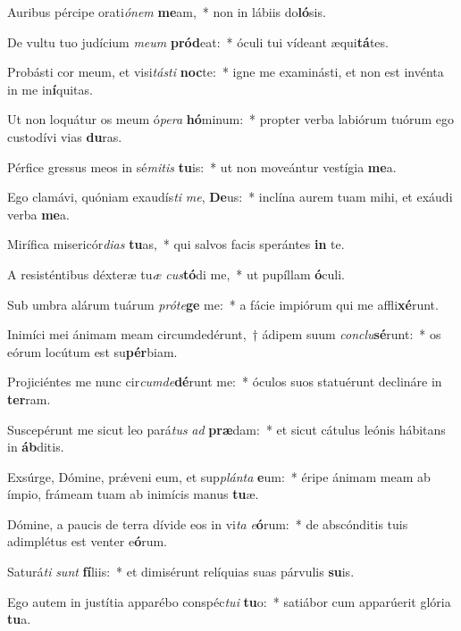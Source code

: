 \item Auribus pércipe orati\textit{ó}\textit{nem} \textbf{me}am,~* non in lábiis do\textbf{ló}sis.
\item De vultu tuo judícium \textit{me}\textit{um} \textbf{pród}eat:~* óculi tui vídeant æqui\textbf{tá}tes.
\item Probásti cor meum, et visi\textit{tás}\textit{ti} \textbf{noc}te:~* igne me examinásti, et non est invénta in me in\textbf{í}quitas.
\item Ut non loquátur os meum ó\textit{pe}\textit{ra} \textbf{hó}minum:~* propter verba labiórum tuórum ego custodívi vias \textbf{du}ras.
\item Pérfice gressus meos in sé\textit{mi}\textit{tis} \textbf{tu}is:~* ut non moveántur vestígia \textbf{me}a.
\item Ego clamávi, quóniam exaudís\textit{ti} \textit{me}, \textbf{De}us:~* inclína aurem tuam mihi, et exáudi verba \textbf{me}a.
\item Mirífica misericór\textit{di}\textit{as} \textbf{tu}as,~* qui salvos facis sperántes \textbf{in} te.
\item A resisténtibus déxteræ tu\textit{æ} \textit{cus}\textbf{tó}di me,~* ut pupíllam \textbf{ó}culi.
\item Sub umbra alárum tuárum \textit{pró}\textit{te}\textbf{ge} me:~* a fácie impiórum qui me affli\textbf{xé}runt.
\item Inimíci mei ánimam meam circumdedérunt,~† ádipem suum \textit{con}\textit{clu}\textbf{sé}runt:~* os eórum locútum est su\textbf{pér}biam.
\item Projiciéntes me nunc cir\textit{cum}\textit{de}\textbf{dé}runt me:~* óculos suos statuérunt declináre in \textbf{ter}ram.
\item Suscepérunt me sicut leo pará\textit{tus} \textit{ad} \textbf{præ}dam:~* et sicut cátulus leónis hábitans in \textbf{áb}ditis.
\item Exsúrge, Dómine, prǽveni eum, et sup\textit{plán}\textit{ta} \textbf{e}um:~* éripe ánimam meam ab ímpio, frámeam tuam ab inimícis manus \textbf{tu}æ.
\item Dómine, a paucis de terra dívide eos in vi\textit{ta} \textit{e}\textbf{ó}rum:~* de abscónditis tuis adimplétus est venter e\textbf{ó}rum.
\item Saturá\textit{ti} \textit{sunt} \textbf{fí}liis:~* et dimisérunt relíquias suas párvulis \textbf{su}is.
\item Ego autem in justítia apparébo conspéc\textit{tu}\textit{i} \textbf{tu}o:~* satiábor cum apparúerit glória \textbf{tu}a.
